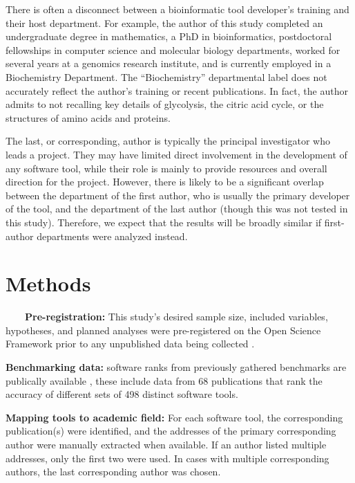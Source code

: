 \documentclass[fleqn,10pt,doc,onecolumn]{SelfArx}%
\begin{document}
There is often a disconnect between a bioinformatic tool developer's
training and their host department. For example, the author of this
study completed an undergraduate degree in mathematics, a PhD in
bioinformatics, postdoctoral fellowships in computer science and
molecular biology departments, worked for several years at a genomics
research institute, and is currently employed in a Biochemistry
Department. The ``Biochemistry'' departmental label does not accurately
reflect the author's training or recent publications. In fact, the
author admits to not recalling key details of glycolysis, the citric
acid cycle, or the structures of amino acids and proteins.

The last, or corresponding, author is typically the principal
investigator who leads a project. They may have limited direct
involvement in the development of any software tool, while
their role is mainly to provide resources and overall direction for
the project. However, there is likely to be a significant overlap between the
department of the first author, who is usually the primary developer
of the tool, and the department of the last author (though this was
not tested in this study). Therefore, we expect that the results will
be broadly similar if first-author departments were analyzed instead.



\section*{Methods}

~~~~\textbf{Pre-registration:} This study's desired sample size, included variables, hypotheses, and
planned analyses were pre-registered on the Open Science Framework
prior to any unpublished data being collected \cite{gardner2024}.

\textbf{Benchmarking data:} software ranks from previously gathered
benchmarks are publically available \cite{Gardner:2022}, these include data from
68 publications that rank the accuracy of different sets of 498
distinct software tools.

\textbf{Mapping tools to academic field:} For each software tool, the
corresponding publication(s) were identified, and the addresses of the
primary corresponding author were manually extracted when
available. If an author listed multiple addresses, only the first two
were used. In cases with multiple corresponding authors, the last
corresponding author was chosen.
\end{document}
